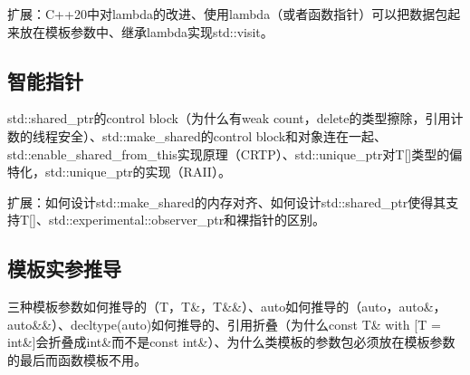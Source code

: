 扩展：C++20中对lambda的改进、使用lambda（或者函数指针）可以把数据包起来放在模板参数中、继承lambda实现std::visit。

\subsection{智能指针}
std::shared\_ptr的control block（为什么有weak count，delete的类型擦除，引用计数的线程安全）、std::make\_shared的control block和对象连在一起、std::enable\_shared\_from\_this实现原理（CRTP）、std::unique\_ptr对T[]类型的偏特化，std::unique\_ptr的实现（RAII）。

扩展：如何设计std::make\_shared的内存对齐、如何设计std::shared\_ptr使得其支持T[]、std::experimental::observer\_ptr和裸指针的区别。

\subsection{模板实参推导}
三种模板参数如何推导的（T，T\&，T\&\&）、auto如何推导的（auto，auto\&，auto\&\&）、decltype(auto)如何推导的、引用折叠（为什么const T\& with [T = int\&]会折叠成int\&而不是const int\&）、为什么类模板的参数包必须放在模板参数的最后而函数模板不用。

